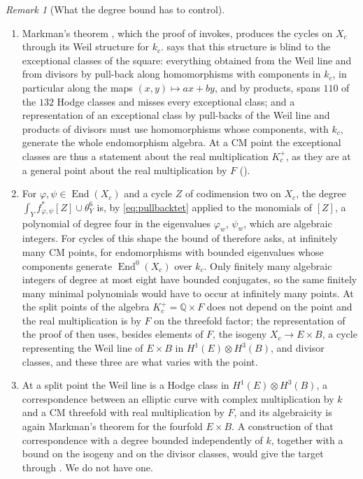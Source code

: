 \documentclass[11pt,reqno]{amsart}
\theoremstyle{plain}
\theoremstyle{definition}
\theoremstyle{remark}
\newtheorem{remark}[theorem]{Remark}
\newcommand{\QQ}{\mathbb{Q}}
\DeclareMathOperator{\End}{End}
\begin{document}
\begin{remark}[What the degree bound has to control]\label{rem:cmsource}
\leavevmode
\begin{enumerate}[label=\textup{(\arabic*)},leftmargin=2.6em,itemsep=3pt]
\item Markman's theorem \cite{Mar25a}, which the proof of
   invokes, produces the cycles on $X_{c}$ through its
  Weil structure for $k_{c}$.  says that this structure
  is blind to the exceptional classes of the square: everything obtained
  from the Weil line and from divisors by pull-back along homomorphisms with
  components in $k_{c}$, in particular along the maps $(x,y)\mapsto ax+by$,
  and by products, spans $110$ of the $132$ Hodge classes and misses every
  exceptional class; and a representation of an exceptional class by
  pull-backs of the Weil line and products of divisors must use
  homomorphisms whose components, with $k_{c}$, generate the whole
  endomorphism algebra. At a CM point the exceptional classes are thus a
  statement about the real multiplication $K_{c}^{+}$, as they are at a
  general point about the real multiplication by $F$
  ().
\item For $\varphi,\psi\in\End(X_{c})$ and a cycle $Z$ of codimension two on
  $X_{c}$, the degree $\int_{Y}f_{\varphi,\psi}^{*}[Z]\cup\theta_{Y}^{6}$
  is, by \eqref{eq:pullbacktet} applied to the monomials of $[Z]$, a
  polynomial of degree four in the eigenvalues $\varphi_{w}$, $\psi_{w}$,
  which are algebraic integers. For cycles of this shape the bound of
   therefore asks, at infinitely many CM points,
  for endomorphisms with bounded eigenvalues whose components generate
  $\End^{0}(X_{c})$ over $k_{c}$. Only finitely many algebraic integers of
  degree at most eight have bounded conjugates, so the same finitely many
  minimal polynomials would have to occur at infinitely many points. At
  the split points of  the algebra $K_{c}^{+}=\QQ\times F$
  does not depend on the point and the real multiplication is by $F$ on the
  threefold factor; the representation of the proof of 
  then uses, besides elements of $F$, the isogeny $X_{c}\to E\times B$, a
  cycle representing the Weil line of $E\times B$ in
  $H^{1}(E)\otimes H^{3}(B)$, and divisor classes, and these three are what
  varies with the point.
\item At a split point the Weil line is a Hodge class in $H^{1}(E)\otimes
  H^{3}(B)$, a correspondence between an elliptic curve with complex
  multiplication by $k$ and a CM threefold with real multiplication by $F$,
  and its algebraicity is again Markman's theorem for the fourfold
  $E\times B$. A construction of that correspondence with a degree bounded
  independently of $k$, together with a bound on the isogeny and on the
  divisor classes, would give the target through .
  We do not have one.
\end{enumerate}
\end{remark}
\end{document}
